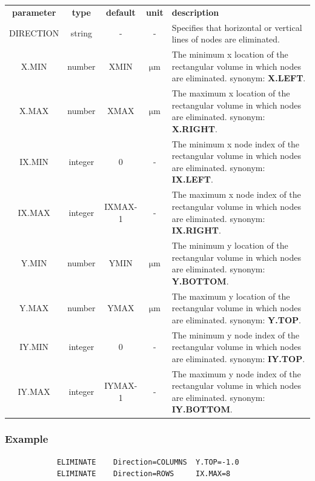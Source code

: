 \documentclass[11pt,pdftex]{article}
\begin{document}
\small
\noindent\begin{longtable}{ccccp{7cm}}
\textbf{parameter}   & \textbf{type}  & \textbf{default} & \textbf{unit} & \textbf{description} \\
DIRECTION   & string  & -       & -                    & Specifies that horizontal or vertical lines of nodes are eliminated. \\
X.MIN       & number  & XMIN    & $\mathrm{\mu m}$     & The minimum x location of the rectangular volume in which nodes are eliminated.
                                                         synonym: \textbf{X.LEFT}. \\
X.MAX       & number  & XMAX    & $\mathrm{\mu m}$     & The maximum x location of the rectangular volume in which nodes are eliminated.
                                                         synonym: \textbf{X.RIGHT}. \\
IX.MIN      & integer & 0       & -                    & The minimum x node index of the rectangular volume in which nodes are eliminated.
                                                         synonym: \textbf{IX.LEFT}.\\
IX.MAX      & integer & IXMAX-1 &-                     & The maximum x node index of the rectangular volume in which nodes are eliminated.
                                                         synonym: \textbf{IX.RIGHT}. \\
Y.MIN       & number  & YMIN    & $\mathrm{\mu m}$     & The minimum y location of the rectangular volume in which nodes are eliminated.
                                                         synonym: \textbf{Y.BOTTOM}. \\
Y.MAX       & number  & YMAX    & $\mathrm{\mu m}$     & The maximum y location of the rectangular volume in which nodes are eliminated.
                                                         synonym: \textbf{Y.TOP}. \\
IY.MIN      & integer & 0       & -                    & The minimum y node index of the rectangular volume in which nodes are eliminated.
                                                         synonym: \textbf{IY.TOP}. \\
IY.MAX      & integer & IYMAX-1 & -                    & The maximum y node index of the rectangular volume in which nodes are eliminated.
                                                         synonym: \textbf{IY.BOTTOM}.
\end{longtable}
\normalsize

\subsubsection*{Example}
\begin{verbatim}
            ELIMINATE    Direction=COLUMNS  Y.TOP=-1.0
            ELIMINATE    Direction=ROWS     IX.MAX=8
\end{verbatim}
\end{document}
